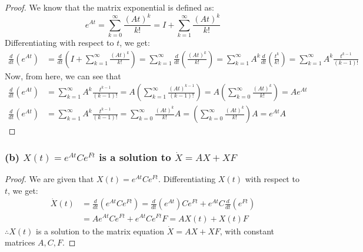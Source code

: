 \begin{proof}
      We know that the matrix exponential is defined as:
      \begin{equation*}
            e^{A t}
            =
            \sum_{k=0}^{\infty} \frac{{(A t)}^{k}}{k !}
            =
            I + \sum_{k=1}^{\infty} \frac{{(A t)}^{k}}{k !}
      \end{equation*}
      Differentiating with respect to \( t \), we get:
      \begin{align*}
            \frac{d}{d t}\left(e^{A t}\right)
             & =
            \frac{d}{d t}\left(I + \sum_{k=1}^{\infty} \frac{{(A t)}^{k}}{k !}\right)
            =
            \sum_{k=1}^{\infty} \frac{d}{d t}\left(\frac{{(A t)}^{k}}{k !}\right)
            =
            \sum_{k=1}^{\infty} A^k \frac{d}{d t}\left(\frac{t^k}{k !}\right)
            =
            \sum_{k=1}^{\infty} A^k \frac{t^{k-1}}{(k-1) !}
      \end{align*}
      Now, from here, we can see that
      \begin{align*}
            \frac{d}{d t}\left(e^{A t}\right)
             & =
            \sum_{k=1}^{\infty} A^k \frac{t^{k-1}}{(k-1) !}
            =
            A \left( \sum_{k=1}^{\infty} \frac{{(A t)}^{k-1}}{(k-1) !} \right)
            =
            A \left( \sum_{k=0}^{\infty} \frac{{(A t)}^{k}}{k !} \right)
            = A e^{A t}
            \\
            \frac{d}{d t}\left(e^{A t}\right)
             & =
            \sum_{k=1}^{\infty} A^k \frac{t^{k-1}}{(k-1) !}
            =
            \sum_{k=0}^{\infty} \frac{{(A t)}^{k}}{k !} A
            =
            \left( \sum_{k=0}^{\infty} \frac{{(A t)}^{k}}{k !} \right) A
            = e^{A t} A
      \end{align*}
\end{proof}

\subsubsection*{(b) \( X(t)=e^{A t} C e^{F t} \) is a solution to \( \dot{X}=A X+X F \)}

\begin{proof}
      We are given that \( X(t)=e^{A t} C e^{F t} \).
      Differentiating \( X(t) \) with respect to \( t \), we get:
      \begin{align*}
            \dot{X}(t)
             & =
            \frac{d}{d t}\left(e^{A t} C e^{F t}\right)
            =
            \frac{d}{d t}\left(e^{A t}\right) C e^{F t} + e^{A t} C \frac{d}{d t}\left(e^{F t}\right)
            \\ & =
            A e^{A t} C e^{F t} + e^{A t} C e^{F t} F
            =
            A X(t) + X(t) F
      \end{align*}
      \( \therefore X(t) \) is a solution to the matrix equation \( \dot{X}=A X+X F \), with constant matrices \( A, C, F \).
\end{proof}

